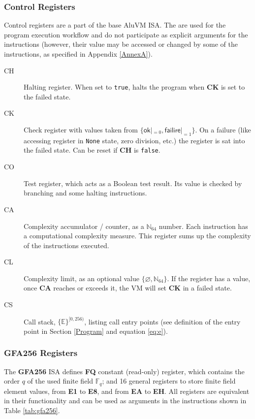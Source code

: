 \documentclass[9pt,oneside]{amsart}
\begin{document}
\begin{multicols}{2}
\subsubsection{Control Registers}\label{Registers}

Control registers are a part of the base AluVM ISA.
The are used for the program execution workflow and do not participate
as explicit arguments for the instructions (however, their value may be accessed or changed
by some of the instructions, as specified in Appendix \ref{AnnexA}).

\begin{description}
\item[CH] Halting register. When set to \texttt{true},
    halts the program when \textbf{CK} is set to the failed state.
\item[CK] Check register with values taken from $\{\mathsf{ok}|_{=0}, \mathsf{failire}|_{=1}\}$.
    On a failure (like accessing register in \texttt{None} state,
    zero division, etc.) the register is sat into the failed state.
    Can be reset if \textbf{CH} is \texttt{false}.
\item[CO] Test register, which acts as a Boolean test result.
    Its value is checked by branching and some halting instructions.
\item[CA] Complexity accumulator / counter, as a $\mathbb{N}_{64}$ number.
    Each instruction has a computational complexity measure.
    This register sums up the complexity of the instructions executed.
\item[CL] Complexity limit, as an optional value $\{\varnothing, \mathbb{N}_{64}\}$.
    If the register has a value, once \textbf{CA} reaches or exceeds it,
    the VM will set \textbf{CK} in a failed state.
\item[CS] Call stack, $\{ \mathbb{E} \}^{[0, 256)}$, listing call entry points
    (see definition of the entry point in Section \ref{Program} and equation \ref{eq:e}).
\end{description}

\subsubsection{\textbf{GFA256} Registers}

The \textbf{GFA256} ISA defines \textbf{FQ} constant (read-only) register,
which contains the order $q$ of the used finite field $\mathbb{F}_q$; and
16 general registers to store finite field element values,
from \textbf{E1} to \textbf{E8}, and from \textbf{EA} to \textbf{EH}.
All registers are equivalent in their functionality and can be used
as arguments in the instructions shown in Table \ref{tab:gfa256}.


\end{multicols}
\end{document}
